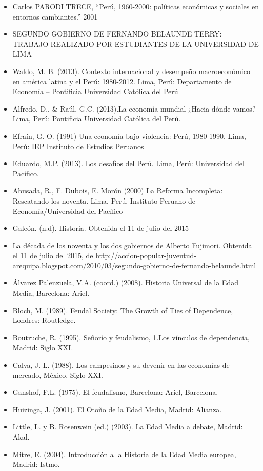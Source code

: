 \documentclass[
  jou,
  floatsintext,
  longtable,
  a4paper,
  nolmodern,
  notxfonts,
  notimes,
  colorlinks=true,linkcolor=blue,citecolor=blue,urlcolor=blue]{apa7}
\providecommand{\tightlist}{%
  \setlength{\itemsep}{0pt}\setlength{\parskip}{0pt}}
\begin{document}
\begin{itemize}
\tightlist
\item
  Carlos PARODI TRECE, ``Perú, 1960-2000: políticas económicas y
  sociales en entornos cambiantes.'' 2001
\item
  SEGUNDO GOBIERNO DE FERNANDO BELAUNDE TERRY: TRABAJO REALIZADO POR
  ESTUDIANTES DE LA UNIVERSIDAD DE LIMA
\item
  Waldo, M. B. (2013). Contexto internacional y desempeño macroeconómico
  en américa latina y el Perú: 1980-2012. Lima, Perú: Departamento de
  Economía -- Pontificia Universidad Católica del Perú
\item
  Alfredo, D., \& Raúl, G.C. (2013).La economía mundial ¿Hacia dónde
  vamos? Lima, Perú: Pontificia Universidad Católica del Perú.
\item
  Efraín, G. O. (1991) Una economía bajo violencia: Perú, 1980-1990.
  Lima, Perú: IEP Instituto de Estudios Peruanos
\item
  Eduardo, M.P. (2013). Los desafíos del Perú. Lima, Perú: Universidad
  del Pacífico.
\item
  Abusada, R., F. Dubois, E. Morón (2000) La Reforma Incompleta:
  Rescatando los noventa. Lima, Perú. Instituto Peruano de
  Economía/Universidad del Pacífico
\item
  Galeón. (n.d). Historia. Obtenida el 11 de julio del 2015
\item
  La década de los noventa y los dos gobiernos de Alberto Fujimori.
  Obtenida el 11 de julio del 2015, de
  http://accion-popular-juventud-arequipa.blogspot.com/2010/03/segundo-gobierno-de-fernando-belaunde.html
\item
  Álvarez Palenzuela, V.A. (coord.) (2008). Historia Universal de la
  Edad Media, Barcelona: Ariel.
\item
  Bloch, M. (1989). Feudal Society: The Growth of Ties of Dependence,
  Londres: Routledge.
\item
  Boutruche, R. (1995). Señorío y feudalismo, 1.Los vínculos de
  dependencia, Madrid: Siglo XXI.
\item
  Calva, J. L. (1988). Los campesinos y su devenir en las economías de
  mercado, México, Siglo XXI.
\item
  Ganshof, F.L. (1975). El feudalismo, Barcelona: Ariel, Barcelona.
\item
  Huizinga, J. (2001). El Otoño de la Edad Media, Madrid: Alianza.
\item
  Little, L. y B. Rosenwein (ed.) (2003). La Edad Media a debate,
  Madrid: Akal.
\item
  Mitre, E. (2004). Introducción a la Historia de la Edad Media europea,
  Madrid: Istmo.
\end{itemize}
\end{document}
